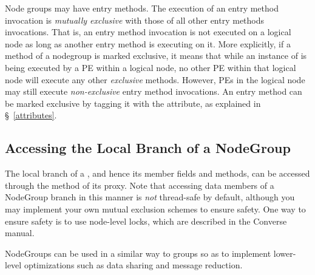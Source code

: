 Node groups may have  entry methods.  The
execution of an  entry method invocation is {\em mutually
exclusive} with those of all other  entry methods invocations.
That is, an  entry method invocation is not executed on a logical
node as long as another  entry method is executing on it.  More
explicitly, if a method  of a nodegroup  is marked exclusive, it
means that while an instance of  is being executed by a PE within a
logical node, no other PE within that logical node will execute any other {\em
exclusive} methods.
However, PEs in the logical node may still execute {\em non-exclusive} entry
method invocations.
An entry method can be marked exclusive by tagging it with the 
attribute, as explained in \S~\ref{attributes}.


\subsection{Accessing the Local Branch of a NodeGroup}

The local branch of a  , and hence its
member fields and methods, can be accessed through the method  of its proxy. Note that accessing data members of
a NodeGroup branch in this manner is {\em not} thread-safe by default, although
you may implement your own mutual exclusion schemes to ensure safety.
One way to ensure safety is to use node-level locks, which are described in the
Converse manual.

NodeGroups can be used in a similar way to groups so as to implement lower-level
optimizations such as data sharing and message reduction.



